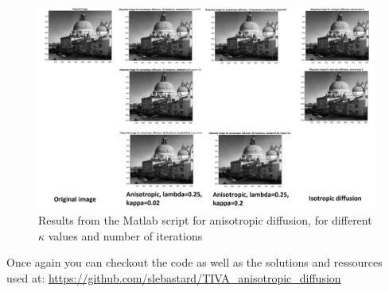 \documentclass[12pt,a4paper]{article}
\begin{document}
\begin{figure}[h]
	\centering
	\includegraphics[scale=0.42]{anisotropic_diffusion.jpg}
	\caption{Results from the Matlab script for anisotropic diffusion, for different $\kappa$ values and number of iterations}	
\end{figure}

Once again you can checkout the code as well as the solutions and ressources used at: \url{https://github.com/slebastard/TIVA\_anisotropic\_diffusion}
\end{document}
